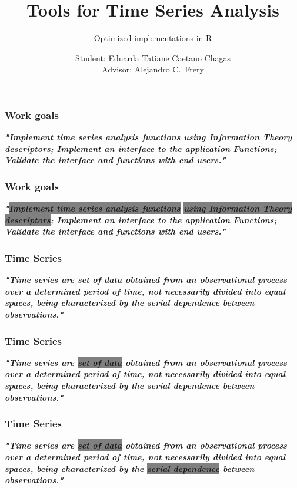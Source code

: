 \documentclass[10pt, compress]{beamer}
\title{\LARGE Tools for Time Series Analysis}
\subtitle{Optimized implementations in R}
\author{Student: Eduarda Tatiane Caetano Chagas\\ 
Advisor: Alejandro C.\ Frery}
\institute{LaCCAN -- Laboratório de análise e computação científica}
\begin{document}
\maketitle


\begin{frame}[fragile]
\frametitle{Work goals}
\begin{sloppypar}
\textit{\textbf{\Large "Implement time series analysis functions using Information Theory descriptors; Implement an interface to the application
Functions; Validate the interface and functions with end users."}}
\end{sloppypar}
\end{frame}

\begin{frame}[fragile]
\frametitle{Work goals}
\begin{sloppypar}
\textit{\textbf{\Large "\colorbox{gray}{Implement time series analysis functions} \colorbox{gray}{using Information Theory descriptors}; Implement an interface to the application
Functions; Validate the interface and functions with end users."}}
\end{sloppypar}
\end{frame}

\begin{frame}[fragile]
\frametitle{Time Series}
\begin{sloppypar}
\textit{\textbf{\Large "Time series are set of data obtained from an observational process over a determined period of time, not necessarily divided into equal spaces, being characterized by the serial dependence between observations."}}
\end{sloppypar}
\end{frame}

\begin{frame}[fragile]
\frametitle{Time Series}
\begin{sloppypar}
\textit{\textbf{\Large "Time series are \colorbox{gray}{set of data} obtained from an observational process over a determined period of time, not necessarily divided into equal spaces, being characterized by the serial dependence between observations."}}
\end{sloppypar}
\end{frame}

\begin{frame}[fragile]
\frametitle{Time Series}
\begin{sloppypar}
\textit{\textbf{\Large "Time series are \colorbox{gray}{set of data} obtained from an observational process over a determined period of time, not necessarily divided into equal spaces, being characterized by the \colorbox{gray}{serial dependence} between observations."}}
\end{sloppypar}
\end{frame}
\end{document}
